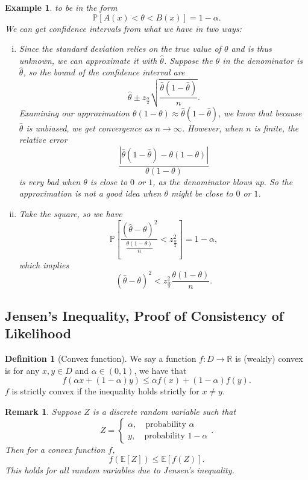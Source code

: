 \documentclass{tufte-handout}
\newcommand*\R{\mathbb{R}}
\newcommand*\E{\mathbb{E}}
\renewcommand{\P}{\mathbb{P}}
\newtheorem{rmk}[thm]{Remark}
\newtheorem{ex}[thm]{Example}
\theoremstyle{definition}
\newtheorem{defn}[thm]{Definition}
\begin{document}
\begin{ex}
	  to be in the form \[
	 	\P\left[A(x) < \theta < B(x)\right] = 1-\alpha
	 .\] We can get confidence intervals from what we have in two ways:
	 \begin{enumerate}[(i)]
	 	\item Since the standard deviation relies on the true value of $\theta$ and is thus unknown, we can approximate it with $\hat{\theta}$. Suppose the $\theta$ in the denominator is $\hat{\theta}$, so the bound of the confidence interval are \[
				\hat{\theta} \pm z_{\frac{\alpha}{2}} \sqrt{\frac{\hat{\theta}\left( 1-\hat{\theta} \right)}{n}} 
	 	.\] Examining our approximation $\theta(1-\theta) \approx \hat{\theta}(1-\hat{\theta})$, we know that because $\hat{\theta}$ is unbiased, we get convergence as $n\to \infty$. However, when $n$ is finite, the relative error \[
	 		\frac{\left| \hat{\theta}(1-\hat{\theta}) - \theta(1-\theta) \right|}{\theta(1-\theta)}
	 	\] is very bad when $\theta$ is close to $0$ or $1$, as the denominator blows up. So the approximation is not a good idea when $\theta$ might be close to $0$ or $1$. 
		\item Take the square, so we have \[
			\P\left[\frac{\left( \hat{\theta} - \theta \right)^2}{\frac{\theta(1-\theta)}{n}} < z^2_{\frac{\alpha}{2}}\right] = 1-\alpha
		,\] which implies \[
		\left( \hat{\theta} - \theta \right)^2 < z_\frac{\alpha}{2}^2 \frac{\theta(1-\theta)}{n}
		.\] 
	 \end{enumerate}
\end{ex}

\subsection{Jensen's Inequality, Proof of Consistency of Likelihood}
\begin{defn}[Convex function]
	We say a function $f: D \to \R$ is (weakly) convex is for any $x,y \in D$ and $\alpha \in (0,1)$, we have that \[
		f(\alpha x + (1-\alpha)y) \le \alpha f(x) + (1-\alpha) f(y)
	.\] $f$ is strictly convex if the inequality holds strictly for $x \ne y$.
\end{defn}

\begin{rmk}
	Suppose $Z$ is a discrete random variable such that \[
		Z = \begin{cases}
			\alpha, \quad \text{probability } \alpha\\
			y, \quad \text{probability } 1-\alpha
		\end{cases}
	.\] Then for a convex function $f$, \[
		f(\E\left[Z\right] ) \le \E\left[f(Z)\right] 
	.\] This holds for all random variables due to Jensen's inequality.
\end{rmk}
\end{document}
